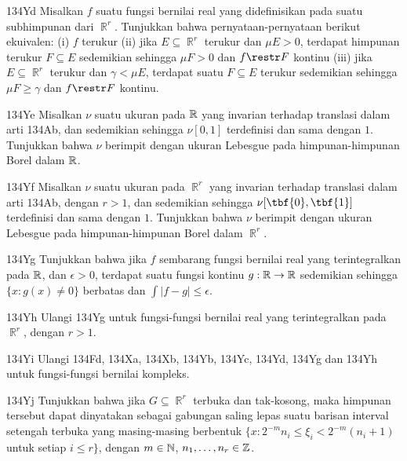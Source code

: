 {\spheader 134Yd Misalkan $f$ suatu fungsi bernilai real yang didefinisikan
pada suatu subhimpunan dari $\BbbR^r$. Tunjukkan bahwa pernyataan-pernyataan
berikut ekuivalen: (i) $f$ terukur (ii) jika $E\subseteq\BbbR^r$ terukur
dan $\mu E>0$, terdapat himpunan terukur $F\subseteq E$ sedemikian sehingga
$\mu F>0$ dan $f\restr F$ kontinu (iii) jika $E\subseteq\BbbR^r$ terukur
dan $\gamma<\mu E$, terdapat suatu $F\subseteq E$ terukur sedemikian
sehingga $\mu F\ge\gamma$ dan $f\restr F$ kontinu. 

\spheader 134Ye Misalkan $\nu$ suatu ukuran pada $\Bbb R$ yang invarian
terhadap translasi dalam arti 134Ab, dan sedemikian sehingga $\nu[0,1]$
terdefinisi dan sama dengan $1$. Tunjukkan bahwa $\nu$ berimpit dengan
ukuran Lebesgue pada himpunan-himpunan Borel dalam $\Bbb R$. 

\spheader 134Yf Misalkan $\nu$ suatu ukuran pada $\BbbR^r$ yang invarian
terhadap translasi dalam arti 134Ab, dengan $r>1$, dan sedemikian sehingga
$\nu[\tbf{0},\tbf{1}]$ terdefinisi dan sama dengan $1$. Tunjukkan bahwa
$\nu$ berimpit dengan ukuran Lebesgue pada himpunan-himpunan Borel dalam
$\BbbR^r$.

\spheader 134Yg Tunjukkan bahwa jika $f$ sembarang fungsi bernilai real yang
terintegralkan pada $\Bbb R$, dan $\epsilon>0$, terdapat suatu fungsi
kontinu $g:\Bbb R\to\Bbb R$ sedemikian sehingga $\{x:g(x)\ne 0\}$ berbatas
dan $\int|f-g|\le\epsilon$. 

\spheader 134Yh Ulangi 134Yg untuk fungsi-fungsi bernilai real yang
terintegralkan pada $\BbbR^r$, dengan $r>1$.

\spheader 134Yi Ulangi 134Fd, 134Xa, 134Xb, 134Yb, 134Yc, 134Yd, 134Yg
dan 134Yh untuk fungsi-fungsi bernilai kompleks.


\spheader 134Yj Tunjukkan bahwa jika $G\subseteq\BbbR^r$ terbuka dan
tak-kosong, maka himpunan tersebut dapat dinyatakan sebagai gabungan saling lepas suatu
barisan interval setengah terbuka yang masing-masing berbentuk
$\{x:2^{-m}n_i\le\xi_i<2^{-m}(n_i+1)$ untuk setiap $i\le r\}$, dengan
$m\in\Bbb N$, $n_1,\ldots,n_r\in\Bbb Z$.

}
